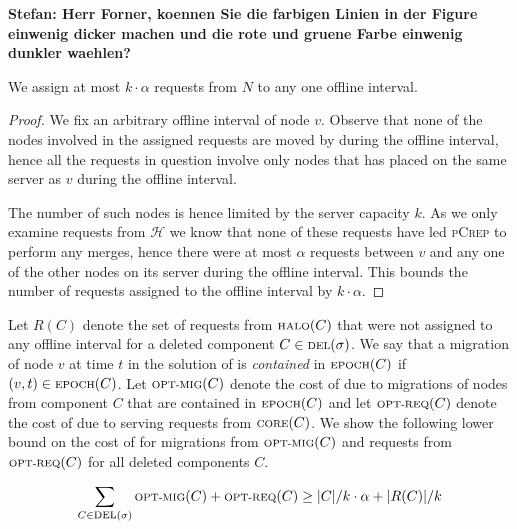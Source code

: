 \documentclass[a4paper,UKenglish,cleveref, autoref, thm-restate,authorcolumns]{lipics-v2019}
\newcommand{\adjDel}{\textsc{pCrep}}
\newcommand{\optmig}{\text{\scriptsize OPT-MIG}}
\newcommand{\optreq}{\text{\scriptsize OPT-REQ}}
\newcommand{\del}{\text{\scriptsize DEL}}
\newcommand{\opt}{\text{O{\scriptsize PT}}}
\newcommand{\core}{\text{\scriptsize CORE}}
\newcommand{\halo}{\text{\scriptsize HALO}}
\newcommand{\epoch}{\text{\scriptsize EPOCH}}
\newcommand\stefan[1]{{\color{blue}\textbf{Stefan: #1 }}}
\begin{document}
\stefan{Herr Forner, koennen Sie die farbigen Linien in der Figure einwenig dicker machen
und die rote und gruene Farbe einwenig dunkler waehlen?}

\begin{lemma}
	\label{offl_int_lemma}
	We assign at most $k\cdot\alpha$ requests from $N$ to any one offline interval.
\end{lemma}

\begin{proof}
	We fix an arbitrary offline interval of node $v$. Observe that none of the nodes involved in the assigned requests are moved by \opt{} during the offline interval, hence all the requests in question involve only nodes that \opt{} has placed on the same server as $v$ during the offline interval. 
	
	The number of such nodes is hence limited by the server capacity $k$. As we only examine requests from $\mathcal{H}$ we know that none of these requests have led \adjDel{} to perform any merges, hence there were at most $\alpha$ requests between $v$ and any one of the other nodes on its server during the offline interval. This bounds the number of requests assigned to the offline interval by $k\cdot\alpha$.
\end{proof}

Let $R(C)$ denote the set of requests from $\halo(C)$ that were not assigned to any offline interval for a deleted component $C\in\del(\sigma)$.
We say that a migration of node $v$ at time $t$ in the solution of \opt{} is \textit{contained} in $\epoch(C)$ if $(v,t)\in\epoch(C)$.
Let $\optmig(C)$ denote the cost of \opt{} due to migrations of nodes from component $C$ that are contained in $\epoch(C)$ and let $\optreq(C)$ denote the cost of \opt{} due to serving requests from $\core(C)$.
We show the following lower bound on the cost of \opt{} for migrations from $\optmig(C)$ and requests from $\optreq(C)$ for all deleted components $C$.

\begin{lemma}
	\label{opt_c_mig_req_lemma}
	\begin{align*}
	\sum_{C\in\del(\sigma)}\optmig(C)+\optreq(C)\geq |C|/k\cdot\alpha+|R(C)|/k
	\end{align*}
\end{lemma}
\end{document}

